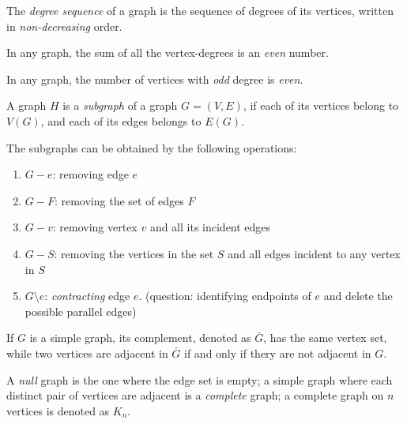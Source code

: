 \begin{definition}
The \emph{degree sequence} of a graph is the sequence of degrees of its vertices, 
written in \emph{non-decreasing} order. 
\end{definition}

\begin{theorem}
In any graph, the sum of all the vertex-degrees is an \emph{even} number.
\end{theorem}
\begin{corollary}
In any graph, the number of vertices with \emph{odd} degree is \emph{even}.
\end{corollary}

\begin{definition}
A graph $H$ is a \emph{subgraph} of a graph $G=(V,E)$,
if each of its vertices belong to $V(G)$,
and each of its edges belongs to $E(G)$.
\end{definition}

\begin{definition}
The subgraphs can be obtained by the following operations:
\begin{enumerate}
\item
$G-e$: removing edge $e$
\item
$G-F$: removing the set of edges $F$
\item
$G-v$: removing vertex $v$ and all its incident edges
\item
$G-S$: removing the vertices in the set $S$ and all edges incident to any vertex in $S$
\item
$G\setminus e$: \emph{contracting} edge $e$. (question: identifying endpoints of $e$ and delete the possible parallel edges)
\end{enumerate}

\end{definition}


\begin{definition}[Complement]
If $G$ is a simple graph, its complement, denoted as $\bar{G}$, has the same vertex set,
while two vertices are adjacent in $\bar{G}$ if and only if thery are not adjacent in $G$.
\end{definition}

\begin{definition}
A \emph{null} graph is the one where the edge set is empty;
a simple graph where each distinct pair of vertices are adjacent is a \emph{complete} graph;
a complete graph on $n$ vertices is denoted as $K_n$.
\end{definition}

